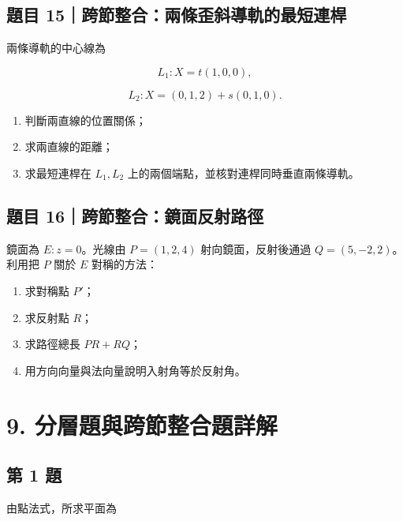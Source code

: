 \documentclass[11pt,a4paper]{article}
\providecommand{\tightlist}{%
  \setlength{\itemsep}{0pt}\setlength{\parskip}{0pt}}
\begin{document}
\subsection{題目 15｜跨節整合：兩條歪斜導軌的最短連桿}\label{ux984cux76ee-15ux8de8ux7bc0ux6574ux5408ux5169ux689dux6b6aux659cux5c0eux8eccux7684ux6700ux77edux9023ux687f}

兩條導軌的中心線為

\[
L_1:X=t(1,0,0),
\]

\[
L_2:X=(0,1,2)+s(0,1,0).
\]

\begin{enumerate}
\def\labelenumi{\arabic{enumi}.}
\tightlist
\item
  判斷兩直線的位置關係；
\item
  求兩直線的距離；
\item
  求最短連桿在 \(L_1,L_2\) 上的兩個端點，並核對連桿同時垂直兩條導軌。
\end{enumerate}

\subsection{題目 16｜跨節整合：鏡面反射路徑}\label{ux984cux76ee-16ux8de8ux7bc0ux6574ux5408ux93e1ux9762ux53cdux5c04ux8defux5f91}

鏡面為 \(E:z=0\)。光線由 \(P=(1,2,4)\) 射向鏡面，反射後通過 \(Q=(5,-2,2)\)。利用把 \(P\) 關於 \(E\) 對稱的方法：

\begin{enumerate}
\def\labelenumi{\arabic{enumi}.}
\tightlist
\item
  求對稱點 \(P'\)；
\item
  求反射點 \(R\)；
\item
  求路徑總長 \(PR+RQ\)；
\item
  用方向向量與法向量說明入射角等於反射角。
\end{enumerate}

\section{9. 分層題與跨節整合題詳解}\label{ux5206ux5c64ux984cux8207ux8de8ux7bc0ux6574ux5408ux984cux8a73ux89e3}

\subsection{第 1 題}\label{ux7b2c-1-ux984c}

由點法式，所求平面為
\end{document}
